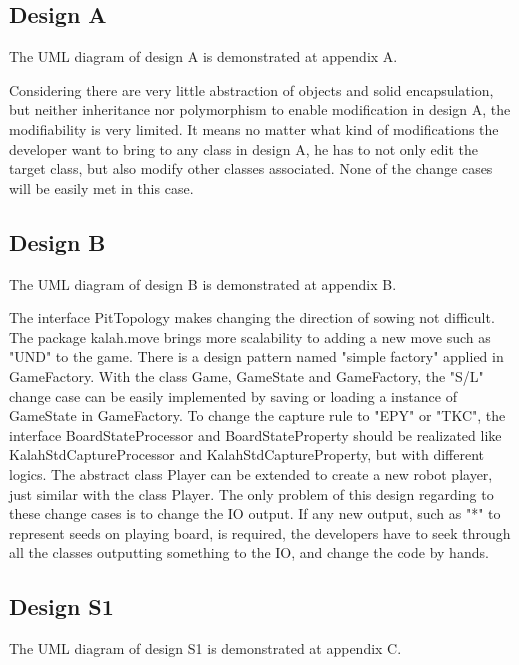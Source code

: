\documentclass[conference]{IEEEtran}
\begin{document}
	\subsection{Design A}
	The UML diagram of design A is demonstrated at appendix A.
	
	Considering there are very little abstraction of objects and solid encapsulation, but neither inheritance nor polymorphism to enable modification in design A, the modifiability is very limited. It means no matter what kind of modifications the developer want to bring to any class in design A, he has to not only edit the target class, but also modify other classes associated. None of the change cases will be easily met in this case.
	
	\subsection{Design B}
	The UML diagram of design B is demonstrated at appendix B.
	
	The interface PitTopology makes changing the direction of sowing not difficult. The package kalah.move brings more scalability to adding a new move  such as "UND" to the game. There is a design pattern named "simple factory" applied in GameFactory. With the class Game, GameState and GameFactory, the "S/L" change case can be easily implemented by saving or loading a instance of GameState in GameFactory. To change the capture rule to "EPY" or "TKC", the interface BoardStateProcessor and BoardStateProperty should be realizated like KalahStdCaptureProcessor and KalahStdCaptureProperty, but with different logics. The abstract class Player can be extended to create a new robot player, just similar with the class Player. The only problem of this design regarding to these change cases is to change the IO output. If any new output, such as "*" to represent seeds on playing board, is required, the developers have to seek through all the classes outputting something to the IO, and change the code by hands.
	
	\subsection{Design S1}
	The UML diagram of design S1 is demonstrated at appendix C.
	
\end{document}
